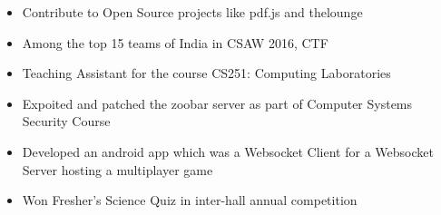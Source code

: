 
\begin{itemize}
  \item Contribute to Open Source projects like pdf.js and thelounge
  \item Among the top 15 teams of India in CSAW 2016, CTF
  \item Teaching Assistant for the course CS251: Computing Laboratories
  \item Expoited and patched the zoobar server as part of Computer Systems
    Security Course
  \item Developed an android app which was a Websocket Client for a
    Websocket Server hosting a multiplayer game
  \item Won Fresher's Science Quiz in inter-hall annual competition
\end{itemize}
